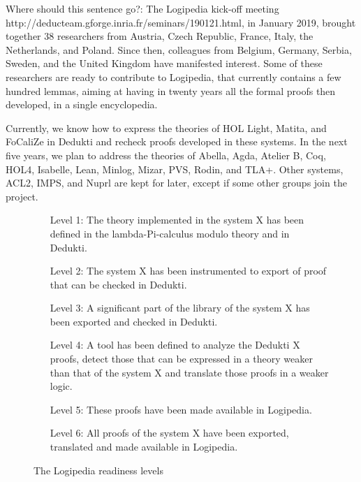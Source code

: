 {\color{red} Where should this sentence go?: The Logipedia kick-off meeting
http://deducteam.gforge.inria.fr/seminars/190121.html, in January
2019, brought together 38 researchers from Austria, Czech Republic,
France, Italy, the Netherlands, and Poland. Since then, colleagues
from Belgium, Germany, Serbia, Sweden, and the United Kingdom have
manifested interest. Some of these researchers are ready to contribute
to Logipedia, that currently contains a few hundred lemmas, aiming at
having in twenty years all the formal proofs then developed, in a
single encyclopedia.}

Currently, we know how to express the theories of {\sc HOL Light},
{\sc Matita}, and {\sc FoCaliZe} in {\sc Dedukti} and recheck proofs
developed in these systems. In the next five years, we plan to address
the theories of {\sc Abella}, {\sc Agda}, {\sc Atelier B}, {\sc Coq},
{\sc HOL4}, {\sc Isabelle}, {\sc Lean}, {\sc Minlog}, {\sc Mizar},
{\sc PVS}, {\sc Rodin}, and {\sc TLA+}. Other systems, {\sc ACL2},
{\sc IMPS}, and {\sc Nuprl} are kept for later, except if some other
groups join the project.

\begin{figure}
\begin{itemize}
\item[Level 1:]
The theory implemented in the system X has been defined in
the lambda-Pi-calculus modulo theory and in Dedukti.

\item[Level 2:]
The system X has been instrumented to export of proof that
can be checked in Dedukti.

\item[Level 3:]
A significant part of the library of the system X has been exported and checked in Dedukti.

\item[Level 4:]
A tool has been defined to analyze the Dedukti X proofs,
detect those that can be expressed in a theory weaker than that of the
system X and translate those proofs in a weaker logic.

\item[Level 5:]
These proofs have been made available in Logipedia.

\item[Level 6:]
All proofs of the system X have been exported, translated
and made available in Logipedia.
\end{itemize}
\caption{The Logipedia readiness levels \label{lrl}}
\end{figure}

